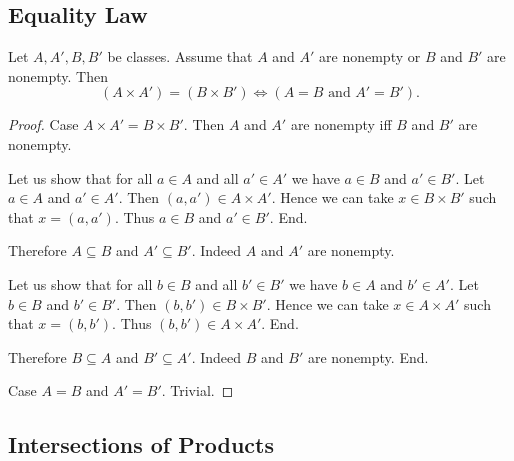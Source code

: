 \documentclass[10pt]{article}
\begin{document}
  \subsection{Equality Law}

  \begin{forthel}
    \begin{proposition}
      Let $A, A', B, B'$ be classes.
      Assume that $A$ and $A'$ are nonempty or $B$ and $B'$ are nonempty.
      Then \[ (A \times A') = (B \times B') \iff
      (\text{$A = B$ and $A' = B'$}). \]
    \end{proposition}
    \begin{proof}
      Case $A \times A' = B \times B'$.
        Then $A$ and $A'$ are nonempty iff $B$ and $B'$ are nonempty.

        Let us show that for all $a \in A$ and all $a' \in A'$ we have $a \in B$
        and $a' \in B'$.
          Let $a \in A$ and $a' \in A'$.
          Then $(a, a') \in A \times A'$.
          Hence we can take $x \in B \times B'$ such that $x = (a, a')$.
          Thus $a \in B$ and $a' \in B'$.
        End.

        Therefore $A \subseteq B$ and $A' \subseteq B'$.
        Indeed $A$ and $A'$ are nonempty.

        Let us show that for all $b \in B$ and all $b' \in B'$ we have $b \in A$
        and $b' \in A'$.
          Let $b \in B$ and $b' \in B'$.
          Then $(b, b') \in B \times B'$.
          Hence we can take $x \in A \times A'$ such that $x = (b, b')$.
          Thus $(b, b') \in A \times A'$.
        End.

        Therefore $B \subseteq A$ and $B' \subseteq A'$.
        Indeed $B$ and $B'$ are nonempty.
      End.

      Case $A = B$ and $A' = B'$. Trivial.
    \end{proof}
  \end{forthel}


  \subsection{Intersections of Products}
\end{document}
